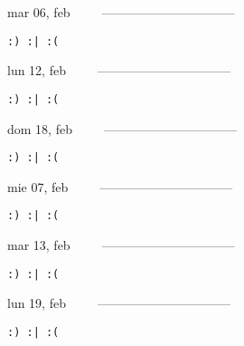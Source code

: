 \documentclass[letterpaper,10pt]{article}
\begin{document}
\begin{multicols}{3}
{mar 06, feb\ \ \ \ \ --------------------------------}
\begin{flushright}\begin{small}\texttt{:) :| :(}\end{small}\end{flushright}
\vfill
{lun 12, feb\ \ \ \ \ --------------------------------}
\begin{flushright}\begin{small}\texttt{:) :| :(}\end{small}\end{flushright}\par
\vfill
{dom 18, feb\ \ \ \ \ --------------------------------}
\begin{flushright}\begin{small}\texttt{:) :| :(}\end{small}\end{flushright}\par
\vfill
\end{multicols}
\vspace{1.05cm}

\begin{multicols}{3}
{mie 07, feb\ \ \ \ \ --------------------------------}
\begin{flushright}\begin{small}\texttt{:) :| :(}\end{small}\end{flushright}
\vfill
{mar 13, feb\ \ \ \ \ --------------------------------}
\begin{flushright}\begin{small}\texttt{:) :| :(}\end{small}\end{flushright}\par
\vfill
{lun 19, feb\ \ \ \ \ --------------------------------}
\begin{flushright}\begin{small}\texttt{:) :| :(}\end{small}\end{flushright}\par
\vfill
\end{multicols}
\vspace{1.05cm}
\end{document}
